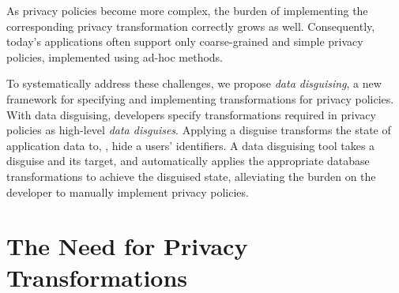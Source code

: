 As privacy policies become more complex, the burden of implementing the corresponding privacy
transformation correctly grows as well.  Consequently, today's applications often support only
coarse-grained and simple privacy policies, implemented using ad-hoc methods.


To systematically address these challenges, we propose \emph{data disguising}, a new framework for
specifying and implementing transformations for privacy policies.
%
With data disguising, developers specify transformations required in privacy policies as high-level \emph{data
disguises}. Applying a disguise transforms the state of application data to, \eg, hide a users'
identifiers.
%
%
A data disguising tool takes a disguise and its target, and automatically applies the appropriate
database transformations to achieve the disguised state, alleviating the burden on the developer to
manually implement privacy policies.

\section{The Need for Privacy Transformations}
\label{sec:survey}

